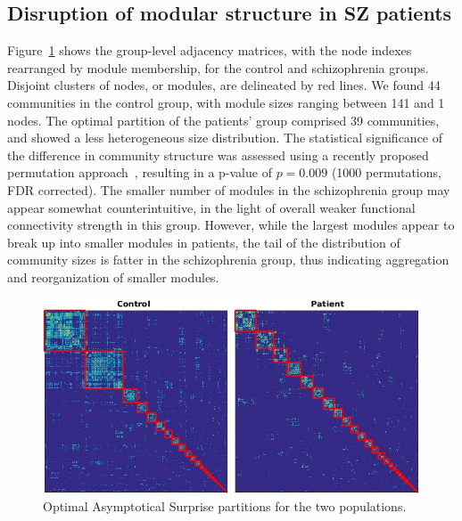 \subsection{Disruption of modular structure in SZ patients}
Figure~\ref{fig:schizo_control_patients} shows the group-level adjacency matrices, with the node indexes rearranged by module membership, for the control and schizophrenia groups.
Disjoint clusters of nodes, or modules, are delineated by red lines.
We found 44 communities in the control group, with module sizes ranging between 141 and 1 nodes.
The optimal partition of the patients' group comprised 39 communities, and showed a less heterogeneous size distribution.
The statistical significance of the difference in community structure was assessed using a recently proposed permutation approach~\cite{alexander-bloch2012}, resulting in a p-value of $p=0.009$ (1000 permutations, FDR corrected).
The smaller number of modules in the schizophrenia group may appear somewhat counterintuitive, in the light of overall weaker functional connectivity strength in this group.
However, while the largest modules appear to break up into smaller modules in patients, the tail of the distribution of community sizes is fatter in the schizophrenia group, thus indicating aggregation and reorganization of smaller modules.
\begin{figure}[!htb]
\centering
\includegraphics[width=\textwidth]{images/schizo/schizo_fig_3.jpg}
\caption{Optimal Asymptotical Surprise partitions for the two populations.}
\label{fig:schizo_control_patients}
\end{figure}

